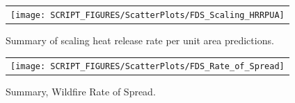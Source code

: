 \begin{figure}[!ht]
\centering
\begin{tabular}{c}
\texttt{[image: SCRIPT\_FIGURES/ScatterPlots/FDS\_Scaling\_HRRPUA]}
\end{tabular}
\caption[Summary of scaling heat release rate per unit area predictions]{Summary of scaling heat release rate per unit area predictions.}
\label{Scaling_Heat_Release_Rate_Per_Unit_Area}
\end{figure}

\begin{figure}[!ht]
\centering
\begin{tabular}{c}
\texttt{[image: SCRIPT\_FIGURES/ScatterPlots/FDS\_Rate\_of\_Spread]}
\end{tabular}
\caption[Summary, Wildfire Rate of Spread]
{Summary, Wildfire Rate of Spread.}
\label{RoS_Summary}
\end{figure}





